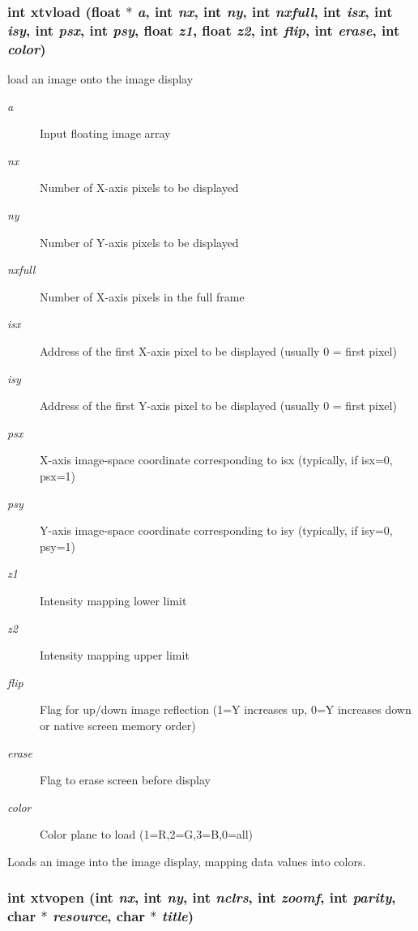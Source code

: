 \subsubsection{\setlength{\rightskip}{0pt plus 5cm}int xtvload (float $\ast$ {\em a}, int {\em nx}, int {\em ny}, int {\em nxfull}, int {\em isx}, int {\em isy}, int {\em psx}, int {\em psy}, float {\em z1}, float {\em z2}, int {\em flip}, int {\em erase}, int {\em color})}\label{xtv_8c_a5}


load an image onto the image display 

\begin{Desc}
\item[Parameters:]
\begin{description}
\item[{\em a}]Input floating image array \item[{\em nx}]Number of X-axis pixels to be displayed \item[{\em ny}]Number of Y-axis pixels to be displayed \item[{\em nxfull}]Number of X-axis pixels in the full frame \item[{\em isx}]Address of the first X-axis pixel to be displayed (usually 0 = first pixel) \item[{\em isy}]Address of the first Y-axis pixel to be displayed (usually 0 = first pixel) \item[{\em psx}]X-axis image-space coordinate corresponding to isx (typically, if isx=0, psx=1) \item[{\em psy}]Y-axis image-space coordinate corresponding to isy (typically, if isy=0, psy=1) \item[{\em z1}]Intensity mapping lower limit \item[{\em z2}]Intensity mapping upper limit \item[{\em flip}]Flag for up/down image reflection (1=Y increases up, 0=Y increases down or native screen memory order) \item[{\em erase}]Flag to erase screen before display \item[{\em color}]Color plane to load (1=R,2=G,3=B,0=all)\end{description}
\end{Desc}
Loads an image into the image display, mapping data values into colors. 
\subsubsection{\setlength{\rightskip}{0pt plus 5cm}int xtvopen (int {\em nx}, int {\em ny}, int {\em nclrs}, int {\em zoomf}, int {\em parity}, char $\ast$ {\em resource}, char $\ast$ {\em title})}\label{xtv_8c_a3}


